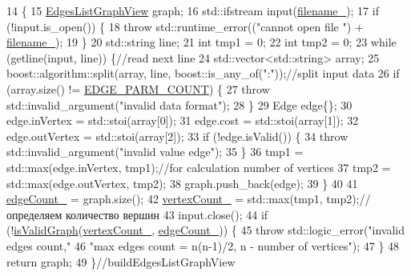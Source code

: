 \begin{DoxyCode}
14                                                                  \{
15             \hyperlink{a00037_aa7134896d837083f384364b56a32bb49_aa7134896d837083f384364b56a32bb49}{EdgesListGraphView} graph;
16             std::ifstream input(\hyperlink{a00007_a49e700993aec96bffaa4728eca205731_a49e700993aec96bffaa4728eca205731}{filename\_});
17             \textcolor{keywordflow}{if} (!input.is\_open()) \{
18                 \textcolor{keywordflow}{throw} std::runtime\_error((\textcolor{stringliteral}{"cannot open file "}) + \hyperlink{a00007_a49e700993aec96bffaa4728eca205731_a49e700993aec96bffaa4728eca205731}{filename\_});
19             \}
20             std::string line;
21             \textcolor{keywordtype}{int} tmp1 = 0;
22             \textcolor{keywordtype}{int} tmp2 = 0;
23             \textcolor{keywordflow}{while} (getline(input, line)) \{\textcolor{comment}{//read next line}
24                 std::vector<std::string> array;
25                 boost::algorithm::split(array, line, boost::is\_any\_of(\textcolor{stringliteral}{":"}));\textcolor{comment}{//split input data}
26                 \textcolor{keywordflow}{if} (array.size() != \hyperlink{a00007_ac15969ca7cebe4751ebfc0b4c5f4e060_ac15969ca7cebe4751ebfc0b4c5f4e060}{EDGE\_PARM\_COUNT}) \{
27                     \textcolor{keywordflow}{throw} std::invalid\_argument(\textcolor{stringliteral}{"invalid data format"});
28                 \}
29                 Edge edge\{\};
30                 edge.inVertex = std::stoi(array[0]);
31                 edge.cost = std::stoi(array[1]);
32                 edge.outVertex = std::stoi(array[2]);
33                 \textcolor{keywordflow}{if} (!edge.isValid()) \{
34                     \textcolor{keywordflow}{throw} std::invalid\_argument(\textcolor{stringliteral}{"invalid value edge"});
35                 \}
36                 tmp1 = std::max(edge.inVertex, tmp1);\textcolor{comment}{//for calculation number of vertices}
37                 tmp2 = std::max(edge.outVertex, tmp2);
38                 graph.push\_back(edge);
39             \}
40 
41             \hyperlink{a00007_a8e9f0fc598b4370e04a32b926c9baf81_a8e9f0fc598b4370e04a32b926c9baf81}{edgeCount\_} = graph.size();
42             \hyperlink{a00007_ae1613c30ca3542a05340fb9b355ed994_ae1613c30ca3542a05340fb9b355ed994}{vertexCount\_} = std::max(tmp1, tmp2);\textcolor{comment}{//определяем количество вершин}
43             input.close();
44             \textcolor{keywordflow}{if} (!\hyperlink{a00007_ad40e02849e59b544cf33fe279f325e5f_ad40e02849e59b544cf33fe279f325e5f}{isValidGraph}(\hyperlink{a00007_ae1613c30ca3542a05340fb9b355ed994_ae1613c30ca3542a05340fb9b355ed994}{vertexCount\_}, \hyperlink{a00007_a8e9f0fc598b4370e04a32b926c9baf81_a8e9f0fc598b4370e04a32b926c9baf81}{edgeCount\_})) \{
45                 \textcolor{keywordflow}{throw} std::logic\_error(\textcolor{stringliteral}{"invalid edges count,"}
46                                                \textcolor{stringliteral}{"max edges count = n(n-1)/2, n - number of vertices"});
47             \}
48             \textcolor{keywordflow}{return} graph;
49         \}\textcolor{comment}{//buildEdgesListGraphView}
\end{DoxyCode}
